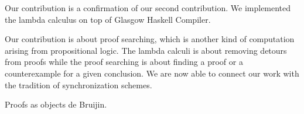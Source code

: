 
Our  contribution is a confirmation of our second contribution.
We implemented the lambda calculus on top of
Glasgow Haskell Compiler.

Our  contribution is about proof searching, which is another
kind of computation arising from propositional logic.
The lambda calculi is about removing detours from proofs while the proof
searching is about finding a proof or a counterexample for a given
conclusion.  
We are now able to connect our work with the tradition of
synchronization schemes.

Proofs as objects de Bruijin.





